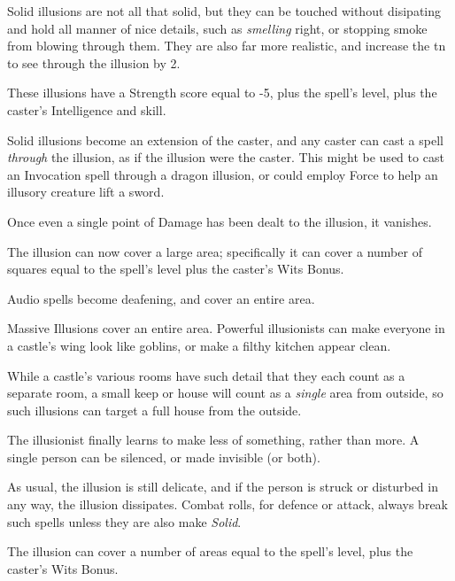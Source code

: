 \begin{multicols}{2}

Solid illusions are not all that solid, but they can be touched without disipating and hold all manner of nice details, such as \emph{smelling} right, or stopping smoke from blowing through them.  They are also far more realistic, and increase the \gls{tn} to see through the illusion by 2.

These illusions have a Strength score equal to -5, plus the spell's level, plus the caster's Intelligence and skill.

Solid illusions become an extension of the caster, and any caster can cast a spell \textit{through} the illusion, as if the illusion were the caster.  This might be used to cast an Invocation spell through a dragon illusion, or could employ Force to help an illusory creature lift a sword.

Once even a single point of Damage has been dealt to the illusion, it vanishes.


The illusion can now cover a large area; specifically it can cover a number of squares equal to the spell's level plus the caster's Wits Bonus.

Audio spells become deafening, and cover an entire area.


Massive Illusions cover an entire area.  Powerful illusionists can make everyone in a castle's wing look like goblins, or make a filthy kitchen appear clean.

While a castle's various rooms have such detail that they each count as a separate room, a small keep or house will count as a \emph{single} area from outside, so such illusions can target a full house from the outside.


The illusionist finally learns to make less of something, rather than more.  A single person can be silenced, or made invisible (or both).

As usual, the illusion is still delicate, and if the person is struck or disturbed in any way, the illusion dissipates.  Combat rolls, for defence or attack, always break such spells unless they are also make \textit{Solid}.


The illusion can cover a number of areas equal to the spell's level, plus the caster's Wits Bonus.

\end{multicols}

